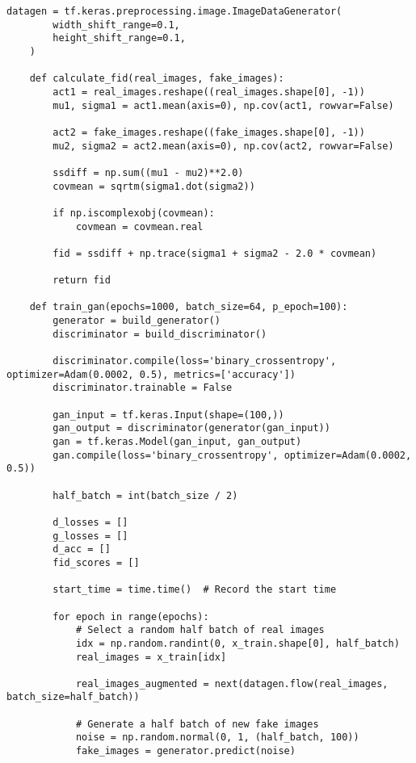 \begin{lstlisting}[style=mypython, caption=Explore Data Augmetation (width and height shift {0.1})]
    datagen = tf.keras.preprocessing.image.ImageDataGenerator(
        width_shift_range=0.1,
        height_shift_range=0.1,
    )
    
    def calculate_fid(real_images, fake_images):
        act1 = real_images.reshape((real_images.shape[0], -1))
        mu1, sigma1 = act1.mean(axis=0), np.cov(act1, rowvar=False)
        
        act2 = fake_images.reshape((fake_images.shape[0], -1))
        mu2, sigma2 = act2.mean(axis=0), np.cov(act2, rowvar=False)
        
        ssdiff = np.sum((mu1 - mu2)**2.0)
        covmean = sqrtm(sigma1.dot(sigma2))
        
        if np.iscomplexobj(covmean):
            covmean = covmean.real
        
        fid = ssdiff + np.trace(sigma1 + sigma2 - 2.0 * covmean)
        
        return fid
    
    def train_gan(epochs=1000, batch_size=64, p_epoch=100):
        generator = build_generator()
        discriminator = build_discriminator()
    
        discriminator.compile(loss='binary_crossentropy', optimizer=Adam(0.0002, 0.5), metrics=['accuracy'])
        discriminator.trainable = False
    
        gan_input = tf.keras.Input(shape=(100,))
        gan_output = discriminator(generator(gan_input))
        gan = tf.keras.Model(gan_input, gan_output)
        gan.compile(loss='binary_crossentropy', optimizer=Adam(0.0002, 0.5))
    
        half_batch = int(batch_size / 2)
        
        d_losses = []
        g_losses = []
        d_acc = []
        fid_scores = []
        
        start_time = time.time()  # Record the start time
    
        for epoch in range(epochs):
            # Select a random half batch of real images
            idx = np.random.randint(0, x_train.shape[0], half_batch)
            real_images = x_train[idx]
    
            real_images_augmented = next(datagen.flow(real_images, batch_size=half_batch))
    
            # Generate a half batch of new fake images
            noise = np.random.normal(0, 1, (half_batch, 100))
            fake_images = generator.predict(noise)
    

\end{lstlisting}
